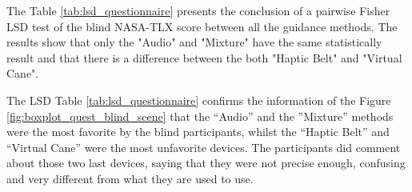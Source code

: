 The Table \ref{tab:lsd_questionnaire} presents the conclusion of a pairwise Fisher LSD test of the blind NASA-TLX score between all the guidance methods. The results show that only the "Audio" and "Mixture" have the same statistically result and that there is a difference between the both "Haptic Belt" and "Virtual Cane".



The LSD Table \ref{tab:lsd_questionnaire} confirms the information of the Figure \ref{fig:boxplot_quest_blind_scene} that the “Audio” and the ”Mixture” methods were the most favorite by the blind participants, whilst the “Haptic Belt” and “Virtual Cane” were the most unfavorite devices. The participants did comment about those two last devices, saying that they were not precise enough, confusing and very different from what they are used to use.

\FloatBarrier